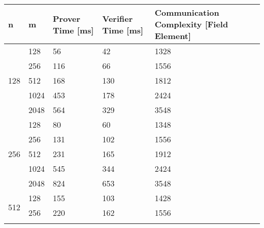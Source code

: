 \begin{table}[h!]
\begin{tabular}{|c|m{4em}|m{4em}|m{4em}|m{7em}|}
\multicolumn{1}{|l|}{n}                     & m    & Prover Time {[}ms{]} & Verifier Time {[}ms{]} & Communication Complexity {[}Field Element{]} \\ \hline\hline
\multirow{5}{*}{128}                        & 128  & 56                   & 42                     & 1328                                         \\ \cline{2-5} 
                                            & 256  & 116                  & 66                     & 1556                                         \\ \cline{2-5} 
                                            & 512  & 168                  & 130                    & 1812                                         \\ \cline{2-5} 
                                            & 1024 & 453                  & 178                    & 2424                                         \\ \cline{2-5} 
                                            & 2048 & 564                  & 329                    & 3548                                         \\ \hline
\multirow{5}{*}{256}                        & 128  & 80                   & 60                     & 1348                                         \\ \cline{2-5} 
                                            & 256  & 131                  & 102                    & 1556                                         \\ \cline{2-5} 
                                            & 512  & 231                  & 165                    & 1912                                         \\ \cline{2-5} 
                                            & 1024 & 545                  & 344                    & 2424                                         \\ \cline{2-5} 
                                            & 2048 & 824                  & 653                    & 3548                                         \\ \hline
\multirow{5}{*}{512}                        & 128  & 155                  & 103                    & 1428                                         \\ \cline{2-5} 
                                            & 256  & 220                  & 162                    & 1556                                         \\ \cline{2-5} 

\end{tabular}
\end{table}
